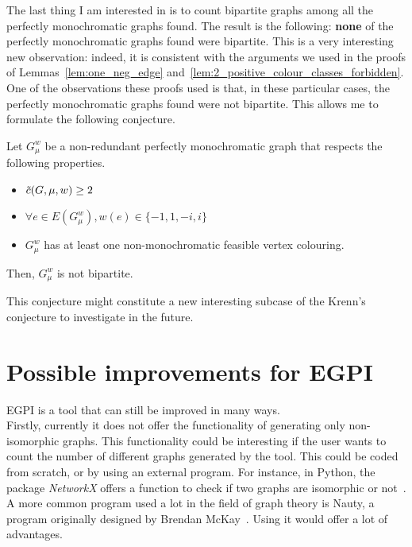 The last thing I am interested in is to count bipartite graphs among all the perfectly monochromatic graphs found.
The result is the following: \textbf{none} of the perfectly monochromatic graphs found were bipartite.
This is a very interesting new observation: indeed, it is consistent with the arguments we used in the proofs of Lemmas~\ref{lem:one_neg_edge} and~\ref{lem:2_positive_colour_classes_forbidden}.
One of the observations these proofs used is that, in these particular cases, the perfectly monochromatic graphs found were not bipartite.
This allows me to formulate the following conjecture.

\begin{conjecture}
    \label{con:bipartite_perfectly_monochromatic}
    Let $G_\mu^w$ be a non-redundant perfectly monochromatic graph that respects the following properties.
    \begin{itemize}
        \item $\Tilde{c}(G, \mu, w) \geq 2$
        \item $\forall e \in E(G_\mu^w), w(e) \in \{-1, 1, -i, i\}$
        \item $G_\mu^w$ has at least one non-monochromatic feasible vertex colouring.
    \end{itemize}
    Then, $G_\mu^w$ is not bipartite.
\end{conjecture}

This conjecture might constitute a new interesting subcase of the Krenn's conjecture to investigate in the future.


\section{Possible improvements for EGPI}
\label{sec:possible-improvements-for-egpi}

EGPI is a tool that can still be improved in many ways.\\

Firstly, currently it does not offer the functionality of generating only non-isomorphic graphs.
This functionality could be interesting if the user wants to count the number of different graphs generated by the tool.
This could be coded from scratch, or by using an external program.
For instance, in Python, the package \textit{NetworkX} offers a function to check if two graphs are isomorphic or not~\cite{networkx}.
A more common program used a lot in the field of graph theory is Nauty, a program originally designed by Brendan McKay~\cite{MCKAY201494}.
Using it would offer a lot of advantages.\\

